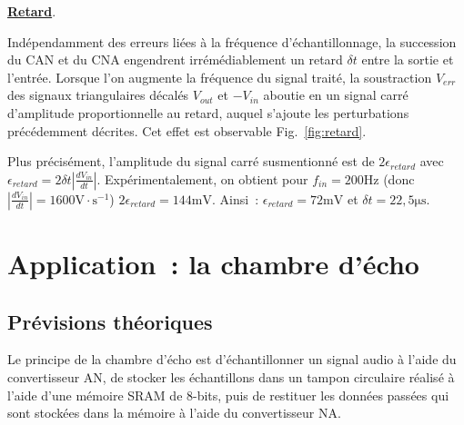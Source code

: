 \documentclass{article}
\begin{document}
\noindent \textbf{\underline{Retard}}.

Indépendamment des erreurs liées à la fréquence d'échantillonnage, la succession du CAN et du CNA engendrent irrémédiablement un retard $\delta t$ entre la sortie et l'entrée. Lorsque l'on augmente la fréquence du signal traité, la soustraction $V_{err}$ des signaux triangulaires décalés $V_{out}$ et $-V_{in}$ aboutie en un signal carré d'amplitude proportionnelle au retard, auquel s'ajoute les perturbations précédemment décrites. Cet effet est observable Fig.~\ref{fig:retard}.

Plus précisément, l'amplitude du signal carré susmentionné est de ${2 \epsilon_{retard}}$ avec ${\epsilon_{retard} = 2 \delta t \left|\frac{dV_{in}}{dt}\right|}$. Expérimentalement, on obtient pour ${f_{in}=200\mathrm{Hz}}$ (donc ${\left|\frac{dV_{in}}{dt}\right|=1600\mathrm{ V\cdot s^{-1}}}$) ${2 \epsilon_{retard} = 144\mathrm{mV}}$. Ainsi~: ${\epsilon_{retard} = 72\mathrm{mV}}$ et  ${\delta t = 22,5\mathrm{\mu s}}$.

























\section{Application~: la chambre d'écho}

\subsection{Prévisions théoriques}

Le principe de la chambre d'écho est d'échantillonner un signal audio à l'aide du convertisseur AN, de stocker les échantillons dans un tampon circulaire réalisé à l'aide d'une mémoire SRAM de 8-bits, puis de restituer les données passées qui sont stockées dans la mémoire à l'aide du convertisseur NA.
\end{document}

